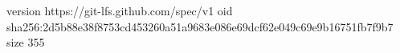 version https://git-lfs.github.com/spec/v1
oid sha256:2d5b88e38f8753cd453260a51a9683e086e69dcf62e049c69e9b16751fb7f9b7
size 355
